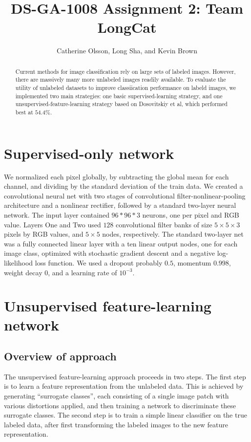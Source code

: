 \documentclass{article} %
\title{DS-GA-1008 Assignment 2: Team LongCat}
\author{
Catherine Olsson, Long Sha, and Kevin Brown \\
}
\begin{document}
\maketitle

\begin{abstract}
Current methods for image classification rely on large sets of labeled images.
However, there are massively many more unlabeled images readily available. To
evaluate the utility of unlabeled datasets to improve classiication performance
on labeld images, we implemented two main strategies: one basic
supervised-learning strategy, and one unsupervised-feature-learning strategy
based on Dosovitskiy et al, which performed best at $54.4\%$.
\end{abstract}

\section{Supervised-only network}

We normalized each pixel globally, by subtracting the global mean for each
channel, and dividing by the standard deviation of the train data. We created a
convolutional neural net with two stages of convolutional
filter-nonlinear-pooling architecture and a nonlinear rectifier, followed by a
standard two-layer neural network. The input layer contained $96*96*3$ neurons,
one per pixel and RGB value. Layers One and Two used $128$ convolutional filter
banks of size $5 \times 5 \times 3$ pixels by RGB values, and $5 \times 5$
nodes, respectively. The standard two-layer net was a fully connected linear
layer with a ten linear output nodes, one for each image class, optimized with
stochastic gradient descent and a negative log-likelihood loss function. We
used a dropout probably $0.5$, momentum $0.998$, weight decay $0$, and a
learning rate of $10^{-3}$.

\section{Unsupervised feature-learning network}
\subsection{Overview of approach}

The unsupervised feature-learning approach proceeds in two steps. The first step is to learn a feature representation from the unlabeled data. This is achieved by generating ``surrogate classes'', each consisting of a single image patch with various distortions applied, and then training a network to discriminate these surrogate classes. The second step is to train a simple linear classifier on the true labeled data, after first transforming the labeled images to the new feature representation.
\end{document}

